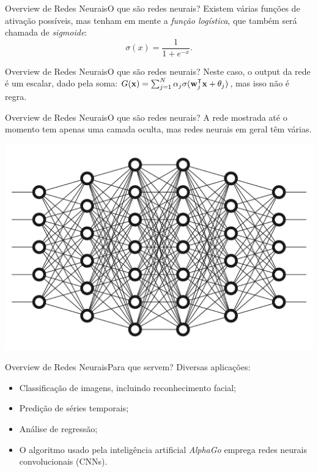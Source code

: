 \documentclass[13pt]{beamer}
\begin{document}
\begin{frame}{Overview de Redes Neurais}{O que são redes neurais?}
    \vspace{2pt}
    Existem várias funções de ativação possíveis, mas tenham em mente a \emph{função logística}, que também será chamada de \emph{sigmoide}:
    \begin{equation*}
        \sigma ( x ) = \frac{ 1 }{ 1 + e^{ -x } }
    .\end{equation*}
    \begin{center}
        
    \end{center}
\end{frame}

\begin{frame}{Overview de Redes Neurais}{O que são redes neurais?}
    \vspace{2pt}
    Neste caso, o output da rede é um escalar, dado pela soma:
    \(
        G ( \mathbf{x} ) = \sum_{ j=1 }^{ N } \alpha_{ j } \sigma ( \mathbf{w}_{ j }^{ \mathsf{T} } \mathbf{x} + \theta_{ j } )
        \),
    mas isso não é regra.
    \begin{center}
        
    \end{center}
\end{frame}

\begin{frame}{Overview de Redes Neurais}{O que são redes neurais?}
    \vspace{2pt}
    A rede mostrada até o momento tem apenas uma camada oculta, mas redes neurais em geral têm várias.
    \begin{center}
        \includegraphics[width=.7\textwidth]{../figuras/multi-layer-neural-network.jpeg}
    \end{center}
\end{frame}

\begin{frame}{Overview de Redes Neurais}{Para que servem?}
    \vspace{2pt}
    Diversas aplicações:
    \begin{itemize}
        \item Classificação de imagens, incluindo reconhecimento facial;
        \item Predição de séries temporais;
        \item Análise de regressão;
        \item O algoritmo usado pela inteligência artificial \emph{AlphaGo} emprega redes neurais convolucionais (CNNs).
    \end{itemize}
\end{frame}

\end{document}
